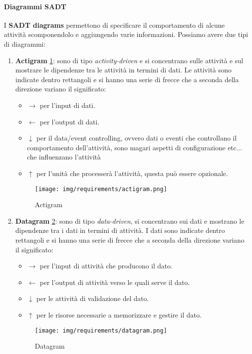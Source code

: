 \paragraph{Diagrammi SADT}
I \textbf{SADT diagrams} permettono di specificare il comportamento di alcune
attività scomponendolo e aggiungendo varie informazioni. Possiamo avere due tipi
di diagrammi:
\begin{enumerate}
    \item \textbf{Actigram} \ref{fig:actigram}: sono di tipo \textit{activity-driven}
          e si concentrano sulle attività e sul mostrare le dipendenze tra le attività
          in termini di dati. Le attività sono indicate dentro rettangoli e si hanno
          una serie di frecce che a seconda della direzione variano il significato:
          \begin{itemize}
              \item $\to$ per l'input di dati.
              \item $\gets$ per l'output di dati.
              \item $\downarrow$ per il data/event controlling, ovvero dati o
                    eventi che controllano il comportamento dell'attività, sono magari
                    aspetti di configurazione etc$\dots$ che influenzano l'attività
              \item $\uparrow$ per l'unità che processerà l'attività, questa può
                    essere opzionale.
          \end{itemize}
          \begin{figure}[!ht]
              \centering
              \texttt{[image: img/requirements/actigram.png]}
              \caption{Actigram}
              \label{fig:actigram}
          \end{figure}
    \item \textbf{Datagram} \ref{fig:datagram}: sono di tipo \textit{data-driven},
          si concentrano sui dati e mostrano le dipendenze tra i dati in termini di
          attività. I dati sono indicate dentro rettangoli e si hanno una serie di frecce
          che a seconda della direzione variano il significato:
          \begin{itemize}
              \item $\to$ per l'input di attività che producono il dato.
              \item $\gets$ per l'output di attività verso le quali serve il dato.
              \item $\downarrow$ per le attività di validazione del dato.
              \item $\uparrow$ per le risorse necessarie a memorizzare e gestire il dato.
          \end{itemize}
          \begin{figure}[!ht]
              \centering
              \texttt{[image: img/requirements/datagram.png]}
              \caption{Datagram}
              \label{fig:datagram}
          \end{figure}
\end{enumerate}
